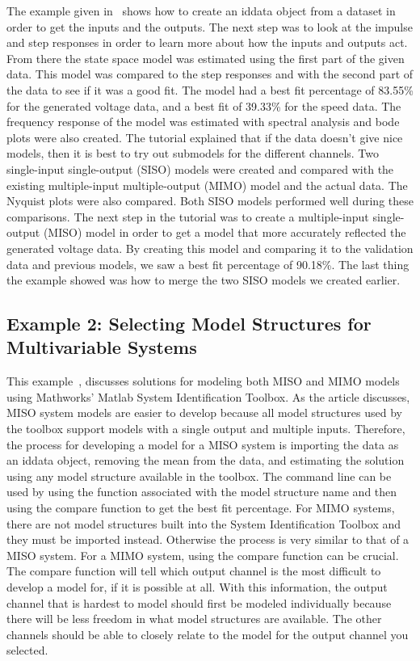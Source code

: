 \documentclass[letterpaper,12pt]{article}   %
\begin{document}
The example given in~\cite{example1} shows how to create an iddata object from a
dataset in order to get the inputs and the outputs. The next step was to look at
the impulse and step responses in order to learn more about how the inputs and
outputs act. From there the state space model was estimated using the first part
of the given data. This model was compared to the step responses and with the
second part of the data to see if it was a good fit. The model had a best fit
percentage of 83.55\% for the generated voltage data, and a best fit of 39.33\%
for the speed data. The frequency response of the model was estimated with
spectral analysis and bode plots were also created. The tutorial explained that
if the data doesn’t give nice models, then it is best to try out submodels for
the different channels. Two single-input single-output (SISO) models were
created and compared with the existing multiple-input multiple-output (MIMO)
model and the actual data. The Nyquist plots were also compared. Both SISO
models performed well during these comparisons. The next step in the tutorial
was to create a multiple-input single-output (MISO) model in order to get a
model that more accurately reflected the generated voltage data. By creating
this model and comparing it to the validation data and previous models, we saw a
best fit percentage of 90.18\%. The last thing the example showed was how to
merge the two SISO models we created earlier.



\subsection{Example 2: Selecting Model Structures for Multivariable Systems}
\label{sec:sysID-Example2}
This example~\cite{Matlab2}, discusses solutions for modeling both MISO and MIMO models using Mathworks' Matlab System Identification Toolbox. As the article discusses, MISO system models are easier to develop because all model structures used by the toolbox support models with a single output and multiple inputs. Therefore, the process for developing a model for a MISO system is importing the data as an iddata object, removing the mean from the data, and estimating the solution using any model structure available in the toolbox. The command line can be used by using the function associated with the model structure name and then using the compare function to get the best fit percentage. For MIMO systems, there are not model structures built into the System Identification Toolbox and they must be imported instead. Otherwise the process is very similar to that of a MISO system. For a MIMO system, using the compare function can be crucial. The compare function will tell which output channel is the most difficult to develop a model for, if it is possible at all. With this information, the output channel that is hardest to model should first be modeled individually because there will be less freedom in what model structures are available. The other channels should be able to closely relate to the model for the output channel you selected.
\end{document}
